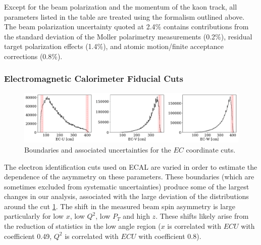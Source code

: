 Except for the beam polarization and the momentum of the kaon track, all parameters listed in the table are treated using the formalism outlined above.  The beam polarization uncertainty quoted at 2.4\% contains contributions from the standard deviation of the Moller polarimetry measurements (0.2\%), residual target polarization effects (1.4\%), and atomic motion/finite acceptance corrections (0.8\%).\\

\subsubsection*{Electromagnetic Calorimeter Fiducial Cuts}

\begin{figure}
	\label{fig:ec_fid_sys}
	\begin{center}
		\includegraphics[width=\textwidth]{image/plots/kaon-bsa/ec-fid-sys.pdf}
		\caption{Boundaries and associated uncertainties for the $EC$ coordinate cuts.}
	\end{center}
\end{figure}

The electron identification cuts used on ECAL are varied in order to estimate the dependence of the asymmetry on these parameters.  These boundaries (which are sometimes excluded from systematic uncertainties) produce some of the largest changes in our analysis, associated with the large deviation of the distributions around the cut \ref{fig:ec_fid_sys}.  The shift in the measured beam spin asymmetry is large particularly for low $x$, low $Q^2$, low $P_T$ and high $z$.  These shifts likely arise from the reduction of statistics in the low angle region ($x$ is correlated with $ECU$ with coefficient 0.49, $Q^2$ is correlated with $ECU$ with coefficient 0.8).   

